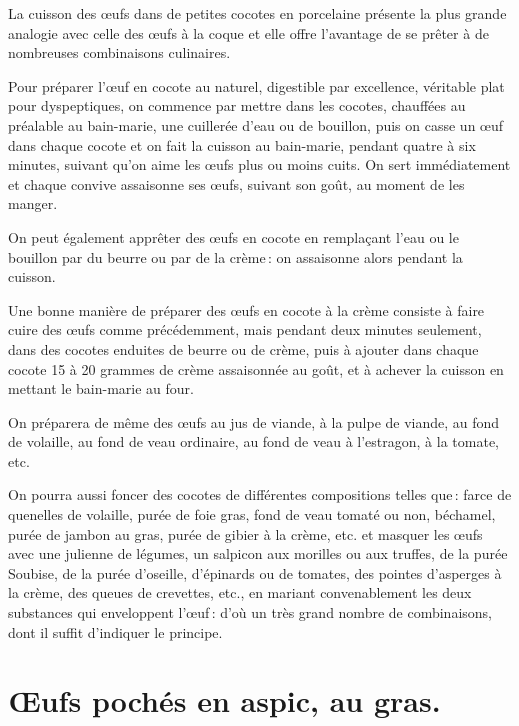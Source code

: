 La cuisson des œufs dans de petites cocotes en porcelaine présente la plus
grande analogie avec celle des œufs à la coque et elle offre l'avantage de se
prêter à de nombreuses combinaisons culinaires.

Pour préparer l'œuf en cocote au naturel, digestible par excellence, véritable
plat pour dyspeptiques, on commence par mettre dans les cocotes, chauffées au
préalable au bain-marie, une cuillerée d’eau ou de bouillon, puis on casse un
œuf dans chaque cocote et on fait la cuisson au bain-marie, pendant quatre
à six minutes, suivant qu'on aime les œufs plus ou moins cuits. On sert
immédiatement et chaque convive assaisonne ses œufs, suivant son goût, au
moment de les manger.

On peut également apprêter des œufs en cocote en remplaçant l'eau ou le
bouillon par du beurre ou par de la crème : on assaisonne alors pendant la
cuisson.

\sk

Une bonne manière de préparer des œufs en cocote à la crème consiste à faire
cuire des œufs comme précédemment, mais pendant deux minutes seulement, dans
des cocotes enduites de beurre ou de crème, puis à ajouter dans chaque cocote
15 à 20 grammes de crème assaisonnée au goût, et à achever la cuisson en
mettant le bain-marie au four.

\sk

On préparera de même des œufs au jus de viande, à la pulpe de viande, au fond
de volaille, au fond de veau ordinaire, au fond de veau à l’estragon, à la
tomate, etc.

\sk

On pourra aussi foncer des cocotes de différentes compositions telles que :
farce de quenelles de volaille, purée de foie gras, fond de veau tomaté ou non,
béchamel, purée de jambon au gras, purée de gibier à la crème, etc. et masquer
les œufs avec une julienne de légumes, un salpicon aux morilles ou aux truffes,
de la purée Soubise, de la purée d'oseille, d'épinards ou de tomates, des
pointes d’asperges à la crème, des queues de crevettes, etc., en mariant
convenablement les deux substances qui enveloppent l'œuf : d'où un très grand
nombre de combinaisons, dont il suffit d'indiquer le principe.

\section*{\centering Œufs pochés en aspic, au gras.}

